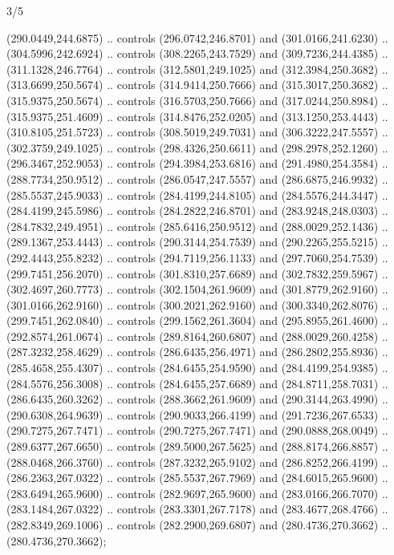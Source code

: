 \begin{flagdescription}{3/5}
\begin{scope}[xshift=0.5\flaglength,yshift=0.5\flagwidth,scale=\flagwidth/270]
\begin{scope}[y=0.8pt, x=0.8pt, yscale=-1,shift={(-281.25,-168.75)}]
  (290.0449,244.6875) .. controls (296.0742,246.8701) and (301.0166,241.6230) ..
  (304.5996,242.6924) .. controls (308.2265,243.7529) and (309.7236,244.4385) ..
  (311.1328,246.7764) .. controls (312.5801,249.1025) and (312.3984,250.3682) ..
  (313.6699,250.5674) .. controls (314.9414,250.7666) and (315.3017,250.3682) ..
  (315.9375,250.5674) .. controls (316.5703,250.7666) and (317.0244,250.8984) ..
  (315.9375,251.4609) .. controls (314.8476,252.0205) and (313.1250,253.4443) ..
  (310.8105,251.5723) .. controls (308.5019,249.7031) and (306.3222,247.5557) ..
  (302.3759,249.1025) .. controls (298.4326,250.6611) and (298.2978,252.1260) ..
  (296.3467,252.9053) .. controls (294.3984,253.6816) and (291.4980,254.3584) ..
  (288.7734,250.9512) .. controls (286.0547,247.5557) and (286.6875,246.9932) ..
  (285.5537,245.9033) .. controls (284.4199,244.8105) and (284.5576,244.3447) ..
  (284.4199,245.5986) .. controls (284.2822,246.8701) and (283.9248,248.0303) ..
  (284.7832,249.4951) .. controls (285.6416,250.9512) and (288.0029,252.1436) ..
  (289.1367,253.4443) .. controls (290.3144,254.7539) and (290.2265,255.5215) ..
  (292.4443,255.8232) .. controls (294.7119,256.1133) and (297.7060,254.7539) ..
  (299.7451,256.2070) .. controls (301.8310,257.6689) and (302.7832,259.5967) ..
  (302.4697,260.7773) .. controls (302.1504,261.9609) and (301.8779,262.9160) ..
  (301.0166,262.9160) .. controls (300.2021,262.9160) and (300.3340,262.8076) ..
  (299.7451,262.0840) .. controls (299.1562,261.3604) and (295.8955,261.4600) ..
  (292.8574,261.0674) .. controls (289.8164,260.6807) and (288.0029,260.4258) ..
  (287.3232,258.4629) .. controls (286.6435,256.4971) and (286.2802,255.8936) ..
  (285.4658,255.4307) .. controls (284.6455,254.9590) and (284.4199,254.9385) ..
  (284.5576,256.3008) .. controls (284.6455,257.6689) and (284.8711,258.7031) ..
  (286.6435,260.3262) .. controls (288.3662,261.9609) and (290.3144,263.4990) ..
  (290.6308,264.9639) .. controls (290.9033,266.4199) and (291.7236,267.6533) ..
  (290.7275,267.7471) .. controls (290.7275,267.7471) and (290.0888,268.0049) ..
  (289.6377,267.6650) .. controls (289.5000,267.5625) and (288.8174,266.8857) ..
  (288.0468,266.3760) .. controls (287.3232,265.9102) and (286.8252,266.4199) ..
  (286.2363,267.0322) .. controls (285.5537,267.7969) and (284.6015,265.9600) ..
  (283.6494,265.9600) .. controls (282.9697,265.9600) and (283.0166,266.7070) ..
  (283.1484,267.0322) .. controls (283.3301,267.7178) and (283.4677,268.4766) ..
  (282.8349,269.1006) .. controls (282.2900,269.6807) and (280.4736,270.3662) ..
  (280.4736,270.3662);

\end{scope}
\end{scope}
\end{flagdescription}
